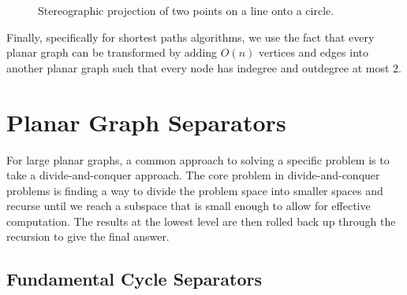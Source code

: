 \documentclass[12pt]{article}
\begin{document}
\begin{figure}[!htb]
  \centering
  \caption{Stereographic projection of two points on a line onto a circle.}
  \label{fig:stereo}
\end{figure}

Finally, specifically for shortest paths algorithms, we use the fact that every planar graph can be transformed by adding $O(n)$ vertices and edges into another planar graph such that every node has indegree and outdegree at most $2$.

\section{Planar Graph Separators}
\label{sec:graph-sep}



    For large planar graphs, a common approach to solving a specific problem is to take a divide-and-conquer approach. The core problem in divide-and-conquer problems is finding a way to divide the problem space into smaller spaces and recurse until we reach a subspace that is small enough to allow for effective computation. The results at the lowest level are then rolled back up through the recursion to give the final answer.

    \subsection{Fundamental Cycle Separators}
    \label{sec:graph-sep-fund-cycle-sep}
\end{document}
